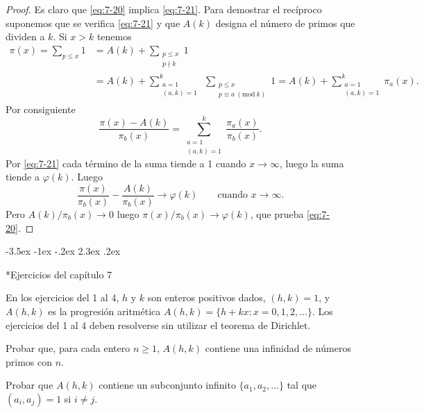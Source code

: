 \documentclass[12pt,a4paper]{book}
\makeatletter
\renewcommand\section{\@startsection{section}{1}{\z@}%
  {-3.5ex \@plus -1ex \@minus -.2ex}%
  {2.3ex \@plus .2ex}%
  {\normalfont\Large\bfseries\raggedright}}
\makeatother
\begin{document}
    \begin{proof}
        Es claro que \eqref{eq:7-20} implica \eqref{eq:7-21}. Para demostrar el recíproco
        suponemos que se verifica \eqref{eq:7-21} y que $A(k)$ designa el número de primos
        que dividen a $k$. Si $x>k$ tenemos
        \begin{align*}
            \pi(x)=\sum_{p\leq x}1&=A(k)+\sum_{\substack{p\leq x\\p\nmid k}}1\\
            &=A(k)+\sum_{\substack{a=1\\(a,k)=1}}^{k}\ \sum_{\substack{p\leq x\\p\equiv a\ (\mathrm{mod}\ k)}}1
            =A(k)+\sum_{\substack{a=1\\(a,k)=1}}^{k}\pi_{a}(x).
        \end{align*}
        Por consiguiente
        \begin{equation*}
            \frac{\pi(x)-A(k)}{\pi_{b}(x)}=\sum_{\substack{a=1\\(a,k)=1}}^{k}\frac{\pi_{a}(x)}{\pi_{b}(x)}.
        \end{equation*}
        Por \eqref{eq:7-21} cada término de la suma tiende a 1 cuando $x\to\infty$, luego
        la suma tiende a $\varphi(k)$. Luego
        \begin{equation*}
            \frac{\pi(x)}{\pi_{b}(x)}-\frac{A(k)}{\pi_{b}(x)}\to\varphi(k)\qquad\text{cuando }x\to\infty.
        \end{equation*}
        Pero $A(k)/\pi_{b}(x)\to0$ luego $\pi(x)/\pi_{b}(x)\to\varphi(k)$, que prueba
        \eqref{eq:7-20}.
    \end{proof}

    \section*{Ejercicios del capítulo 7}

    En los ejercicios del 1 al 4, $h$ y $k$ son enteros positivos dados, $(h,k)=1$, y
    $A(h,k)$ es la progresión aritmética
    $A(h,k)=\{h+kx:x=0,1,2,\dots\}$. Los ejercicios del 1 al 4 deben resolverse sin
    utilizar el teorema de Dirichlet.

    \begin{ejercicio}
        Probar que, para cada entero $n\geq1$, $A(h,k)$ contiene una infinidad de números
        primos con $n$.
    \end{ejercicio}

    \begin{ejercicio}
        Probar que $A(h,k)$ contiene un subconjunto infinito $\{a_{1},a_{2},\dots\}$ tal que
        $(a_{i},a_{j})=1$ si $i\neq j$.
    \end{ejercicio}
\end{document}
